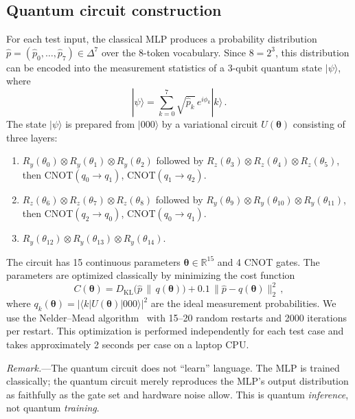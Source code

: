 \documentclass[prl,twocolumn,superscriptaddress,longbibliography,floatfix]{revtex4-2}
\begin{document}
\subsection{Quantum circuit construction}

For each test input, the classical MLP produces a probability distribution $\hat{p} = (\hat{p}_0, \ldots, \hat{p}_7) \in \Delta^7$ over the 8-token vocabulary. Since $8 = 2^3$, this distribution can be encoded into the measurement statistics of a 3-qubit quantum state $|\psi\rangle$, where
\begin{equation}\label{eq:encoding}
  |\psi\rangle = \sum_{k=0}^{7} \sqrt{\hat{p}_k}\, e^{i\phi_k} |k\rangle\,.
\end{equation}
The state $|\psi\rangle$ is prepared from $|000\rangle$ by a variational circuit $U(\boldsymbol{\theta})$ consisting of three layers:
\begin{enumerate}
  \item $R_y(\theta_0)\otimes R_y(\theta_1)\otimes R_y(\theta_2)$ followed by $R_z(\theta_3)\otimes R_z(\theta_4)\otimes R_z(\theta_5)$, then CNOT$(q_0 \to q_1)$, CNOT$(q_1 \to q_2)$.
  \item $R_z(\theta_6)\otimes R_z(\theta_7)\otimes R_z(\theta_8)$ followed by $R_y(\theta_9)\otimes R_y(\theta_{10})\otimes R_y(\theta_{11})$, then CNOT$(q_2 \to q_0)$, CNOT$(q_0 \to q_1)$.
  \item $R_y(\theta_{12})\otimes R_y(\theta_{13})\otimes R_y(\theta_{14})$.
\end{enumerate}
The circuit has 15 continuous parameters $\boldsymbol{\theta} \in \mathbb{R}^{15}$ and 4 CNOT gates. The parameters are optimized classically by minimizing the cost function
\begin{equation}\label{eq:cost}
  C(\boldsymbol{\theta}) = D_{\mathrm{KL}}\!\bigl(\hat{p}\,\|\,q(\boldsymbol{\theta})\bigr) + 0.1\,\|\hat{p} - q(\boldsymbol{\theta})\|_2^2\,,
\end{equation}
where $q_k(\boldsymbol{\theta}) = |\langle k|U(\boldsymbol{\theta})|000\rangle|^2$ are the ideal measurement probabilities. We use the Nelder--Mead algorithm~\cite{NelderMead1965} with 15--20 random restarts and 2000 iterations per restart. This optimization is performed independently for each test case and takes approximately 2 seconds per case on a laptop CPU.

\emph{Remark.}---The quantum circuit does not ``learn'' language. The MLP is trained classically; the quantum circuit merely reproduces the MLP's output distribution as faithfully as the gate set and hardware noise allow. This is quantum \emph{inference}, not quantum \emph{training}.
\end{document}
